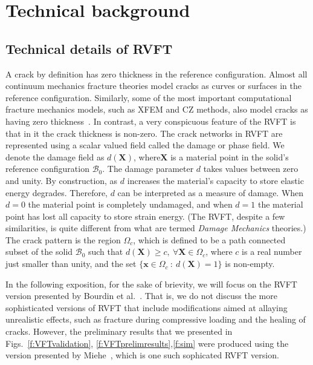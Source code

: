 \documentclass[10pt,letterpaper]{article}
\newcommand{\bs}[1]{\ensuremath{\boldsymbol{#1}}}
\begin{document}
\section{Technical background}
  \label{s:propres}

\subsection{Technical details of RVFT}
\label{sec:TechnicalDetails}

A  crack by definition has zero thickness in the reference configuration. Almost all  continuum mechanics fracture theories model cracks as curves or  surfaces in the reference configuration. Similarly,  some of the most important computational fracture mechanics models, such as XFEM and CZ methods, also model  cracks as having zero thickness~\cite{day1994zero,benvenuti2008regularized}.  In contrast, a very conspicuous feature of the RVFT is that in it the crack thickness is non-zero. The  crack networks in RVFT are represented using a scalar valued field called the damage or phase field.  We denote the damage field as  $d(\bs{X})$, where$\bs{X}$ is a material point in the solid's reference configuration $\mathcal{B}_0$.
The damage  parameter $d$  takes values between zero and unity. By construction, as $d$ increases the material's capacity to store elastic energy degrades. Therefore, $d$ can be interpreted as a measure of damage. When $d=0$ the material point is completely undamaged, and when $d=1$ the material point has lost all capacity to store strain energy. (The RVFT, despite a few similarities, is quite different from what are termed \textit{Damage Mechanics} theories.)  The crack pattern is the region $\Omega_c$, which is defined to be a path connected subset of the solid $\mathcal{B}_0$ such that $d(\bs{X})\ge c,~\forall\bs{X}\in \Omega_c$, where $c$ is a real number just smaller than unity, and the set $\{\bs{x}\in \Omega_c~:~d(\bs{X})=1\}$ is non-empty.%


In the following exposition, for the sake of brievity,  we will focus  on the RVFT version presented by Bourdin et al.~\cite{bourdin2000numerical, bourdin_2008}.  That is, we do not discuss the more sophisticated versions of  RVFT that include modifications  aimed at allaying  unrealistic effects, such as fracture during compressive loading and the healing of cracks. However,  the  preliminary results that we presented in Figs.~\ref{f:VFTvalidation}, \ref{f:VFTprelimresults},\ref{f:sim} were produced using the version presented by Miehe~\cite{miehe2010phase}, which is one  such sophicated  RVFT version.
\end{document}
